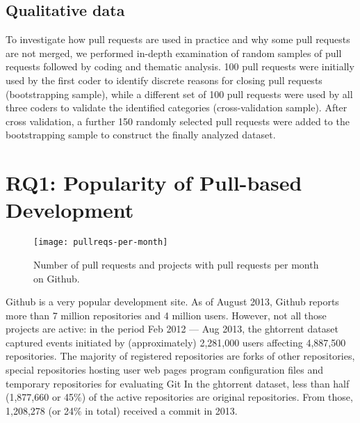 \documentclass{sig-alternate}
\begin{document}
\subsection{Qualitative data}
\label{sec:qualdata}
To investigate how pull requests are used in practice and why some pull requests
are not merged, we performed in-depth examination of random samples of pull
requests followed by coding and thematic analysis. 100 pull requests were initially
used by the first coder to identify discrete reasons for closing pull requests
(bootstrapping sample), while a different set of 100 pull requests were used by
all three coders to validate the identified categories (cross-validation
sample). After cross validation, a further 150 randomly selected pull requests
were added to the bootstrapping sample to construct the finally analyzed
dataset.


\section{RQ1: Popularity of Pull-based Development}
\label{sec:github}
%

\begin{figure}[t]
  \centering
\texttt{[image: pullreqs-per-month]}
\label{fig:pullreq-per-month}
\caption{Number of pull requests and projects with pull requests per month on
Github.}
\end{figure}

Github is a very popular development site. As of August 2013, Github reports
more than 7 million repositories and 4 million users. However, not all those
projects are active: in the period Feb 2012 --- Aug 2013, the {\sc ght}orrent dataset captured events initiated by
(approximately) 2,281,000 users affecting 4,887,500 repositories. The majority
of registered repositories are forks of other repositories, special repositories
hosting user web pages 
program
configuration files 
and temporary repositories for evaluating Git 
In the {\sc ght}orrent dataset, less than half
(1,877,660 or 45\%) of the active repositories are original repositories. From
those, 1,208,278 (or 24\% in total) received a commit in 2013.
\end{document}
